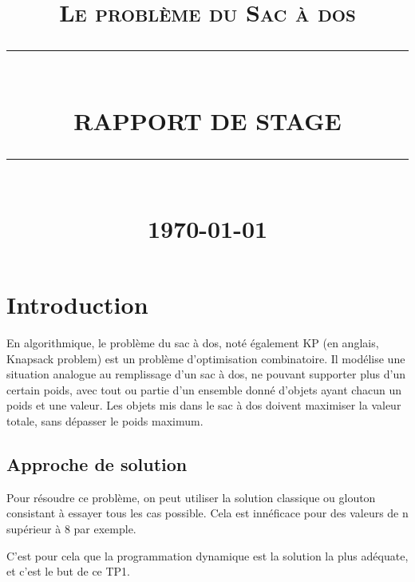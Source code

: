 \documentclass[12pt]{report}
\newcommand{\HRule}[1]{\rule{\linewidth}{#1}}
\begin{document}
	\renewcommand{\contentsname}{Table des Matières}
	\author{}        
	\date{} 
	\title{  \textsc{ Le problème du Sac à dos}
		\\ [2.0cm]
		\HRule{0.5pt} \\
		\LARGE \textbf{\uppercase{Rapport de Stage }}
		\HRule{2pt} \\ [0.5cm]
		\normalsize \today \vspace*{5\baselineskip}}
	\maketitle
	\tableofcontents
	\renewcommand{\contentsname}
	\newpage
	\sectionfont{\scshape}
	
	\chapter{Introduction}
	 En algorithmique, le problème du sac à dos, noté également KP (en anglais, Knapsack problem) est un problème d'optimisation combinatoire. Il modélise une situation analogue au remplissage d'un sac à dos, ne pouvant supporter plus d'un certain poids, avec tout ou partie d'un ensemble donné d'objets ayant chacun un poids et une valeur. Les objets mis dans le sac à dos doivent maximiser la valeur totale, sans dépasser le poids maximum.
	\section{Approche de solution}
\par{}
	Pour résoudre ce problème, on peut utiliser la solution classique ou glouton consistant à essayer tous les cas possible. Cela est innéficace pour des valeurs de n supérieur à 8 par exemple.
\par{}
	C'est pour cela que la programmation dynamique est la solution la plus adéquate, et c'est le but de ce TP1.
	
\end{document}
